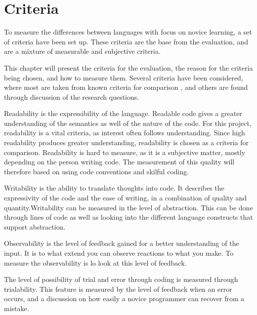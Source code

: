 \chapter{Criteria}
\label{chap:criteria}
To measure the differences between languages with focus on novice learning, a set of criteria have been set up. These criteria are the base from the evaluation, and are a mixture of measurable and subjective criteria.

This chapter will present the criteria for the evaluation, the reason for the criteria being chosen, and how to measure them. Several criteria have been considered, where most are taken from known criteria for comparison \cite{design_criteria1} \cite{design_criteria2}, and others are found through discussion of the research questions.

\begin{description}[style=nextline]
\item[Readability] Readability is the expressibility of the language. Readable code gives a greater understanding of the semantics as well of the nature of the code. For this project, readability is a vital criteria, as interest often follows understanding. Since high readability produces greater understanding, readability is chosen as a criteria for comparison. Readability is hard to measure, as it is a subjective matter, mostly depending on the person writing code. The measurement of this quality will therefore based on using code conventions and skilful coding.
\item[Writability] Writability is the ability to translate thoughts into code. It describes the expressivity of the code and the ease of writing, in a combination of quality and quantity.Writability can be measured in the level of abstraction. This can be done through lines of code as well as looking into the different language constructs that support abstraction.
\item[Observability] Observability is the level of feedback gained for a better understanding of the input. It is to what extend you can observe reactions to what you make. To measure the observability is lo look at this level of feedback.
\item[Trialability] The level of possibility of trial and error through coding is measured through trialability. This feature is measured by the level of feedback when an error occurs, and a discussion on how easily a novice programmer can recover from a mistake.
\item[Learnability]
\item[Reusability]
\item[Pedagogic Value]
\item[Environment]
\item[Documentation]
\item[Security]
\item[Uniformity]
\end{description}